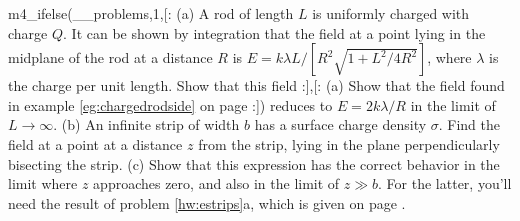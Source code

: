 m4_ifelse(__problems,1,[:%
          (a) A rod of length $L$ is uniformly charged with charge $Q$.
          It can be shown by integration that the field at a point lying in the midplane of the rod
          at a distance $R$ is  $E =  k\lambda L/\left[R^2\sqrt{1+ L^2/4 R^2}\right]$, where $\lambda$
          is the charge per unit length. Show that this field
        :],[:%
          (a) Show that the field found in example \ref{eg:chargedrodside} on page \pageref{eg:chargedrodside}
        :])%
        reduces to $E=2k\lambda/R$ in the limit of $L\rightarrow\infty$.\hwendpart
        (b) An infinite strip of width $b$ has a surface charge density $\sigma$.
        Find the field at a point at a distance $z$ from the strip,
        lying in the plane perpendicularly bisecting the strip.
        \answercheck\hwendpart
        (c) Show that this expression has the
        correct behavior in the limit where $z$ approaches zero,
        and also in the limit of $z\gg b$. For the latter, you'll need
        the result of problem \ref{hw:estrips}a, which is given
        on page \pageref{hwans:estrips}.
